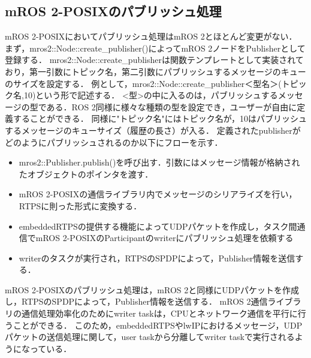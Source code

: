\subsection{mROS 2-POSIXのパブリッシュ処理}
mROS 2-POSIXにおいてパブリッシュ処理はmROS 2とほとんど変更がない．
まず，mros2::Node::create\_publisher()によってmROS 2ノードをPublisherとして登録する．
mros2::Node::create\_publisherは関数テンプレートとして実装されており，第一引数にトピック名，第二引数にパブリッシュするメッセージのキューのサイズを設定する．
例として，mros2::Node::create\_publisher＜型名＞(トピック名,10)という形で記述する．
<型>の中に入るのは，パブリッシュするメッセージの型である．ROS 2同様に様々な種類の型を設定でき，ユーザーが自由に定義することができる．
同様に"トピック名"にはトピック名が，10はパブリッシュするメッセージのキューサイズ（履歴の長さ）が入る．
定義されたpublisherがどのようにパブリッシュされるのか以下にフローを示す．
\begin{itemize}
    \item mros2::Publisher.publish()を呼び出す．引数にはメッセージ情報が格納されたオブジェクトのポインタを渡す．
    \item mROS 2-POSIXの通信ライブラリ内でメッセージのシリアライズを行い，RTPSに則った形式に変換する．
    \item embeddedRTPSの提供する機能によってUDPパケットを作成し，タスク間通信でmROS 2-POSIXのParticipantのwriterにパブリッシュ処理を依頼する
    \item writerのタスクが実行され，RTPSのSPDPによって，Publisher情報を送信する．
\end{itemize}
mROS 2‐POSIXのパブリッシュ処理は，mROS 2と同様にUDPパケットを作成し，RTPSのSPDPによって，Publisher情報を送信する．
mROS 2通信ライブラリの通信処理効率化のためにwriter taskは，CPUとネットワーク通信を平行に行うことができる．
このため，embeddedRTPSやlwIPにおけるメッセージ，UDPパケットの送信処理に関して，user taskから分離してwriter taskで実行されるようになっている．
